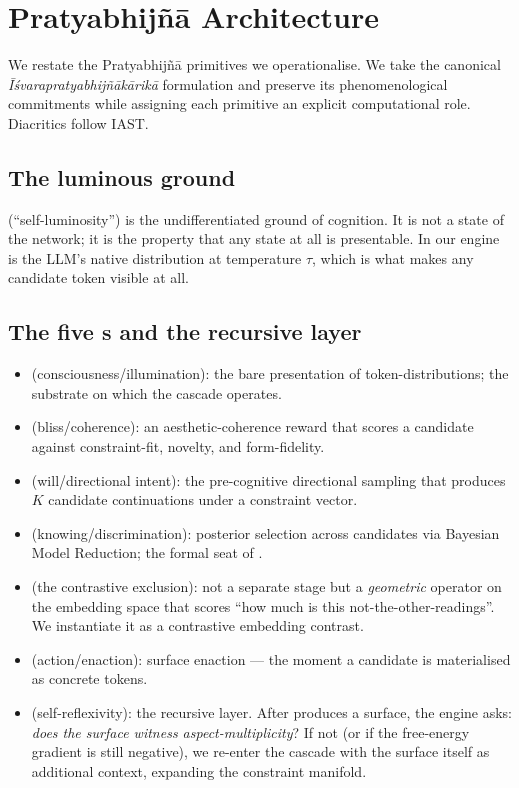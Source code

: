 \section{Pratyabhij\~n\=a Architecture}\label{sec:pratyabhijna_background}

We restate the Pratyabhij\~n\=a primitives we operationalise. We take the canonical \emph{\=I\'svarapratyabhij\~n\=ak\=arik\=a} formulation and preserve its phenomenological commitments while assigning each primitive an explicit computational role. Diacritics follow IAST.

\subsection{The luminous ground}

 (``self-luminosity'') is the undifferentiated ground of cognition. It is not a state of the network; it is the property that any state at all is presentable. In our engine  is the LLM's native distribution at temperature $\tau$, which is what makes any candidate token visible at all.

\subsection{The five s and the recursive layer}

\begin{itemize}[leftmargin=1.2em]
\item \textbf{} (consciousness/illumination): the bare presentation of token-distributions; the substrate on which the cascade operates.
\item \textbf{} (bliss/coherence): an aesthetic-coherence reward that scores a candidate against constraint-fit, novelty, and form-fidelity.
\item \textbf{} (will/directional intent): the pre-cognitive directional sampling that produces $K$ candidate continuations under a constraint vector.
\item \textbf{} (knowing/discrimination): posterior selection across candidates via Bayesian Model Reduction; the formal seat of .
\item \textbf{} (the contrastive exclusion): not a separate stage but a \emph{geometric} operator on the embedding space that scores ``how much is this not-the-other-readings''. We instantiate it as a contrastive embedding contrast.
\item \textbf{} (action/enaction): surface enaction --- the moment a candidate is materialised as concrete tokens.
\item \textbf{} (self-reflexivity): the recursive layer. After  produces a surface, the engine asks: \emph{does the surface witness aspect-multiplicity}? If not (or if the free-energy gradient is still negative), we re-enter the cascade with the surface itself as additional context, expanding the constraint manifold.
\end{itemize}

